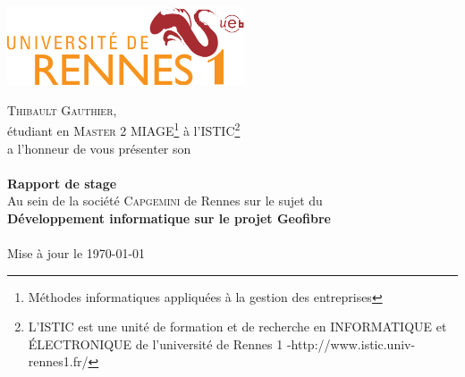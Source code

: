 \begin{titlepage}
  \begin{minipage}[t]{5cm} %
    \flushleft \includegraphics[width = 7cm]{images/logo_univrennes1.png}
    \hfill \noindent
  \end{minipage}
  \vspace*{\fill}
  \begin{center}
    \textsc{Thibault Gauthier},\\ étudiant en \textsc{Master 2 MIAGE\footnote{Méthodes informatiques appliquées à la gestion des entreprises}} à l'\textsc{ISTIC\footnote{L'ISTIC est une unité de formation et de recherche
    en INFORMATIQUE et ÉLECTRONIQUE de l'université de Rennes 1 -http://www.istic.univ-rennes1.fr/}}\\a l'honneur de vous présenter son\\[0.4cm]
    \hr\\[0.5cm]
    {\huge\textbf{Rapport de stage }}\\[0.4cm]
    Au sein de la société \textsc{Capgemini} de Rennes sur le sujet du\\[0.4cm]
    {\large\textbf{Développement informatique sur le projet Geofibre}}\\[0.4cm]
    \hr\\[0.5cm]
    Mise à jour le \today
  \end{center}
  \vspace*{\fill}
\end{titlepage}
